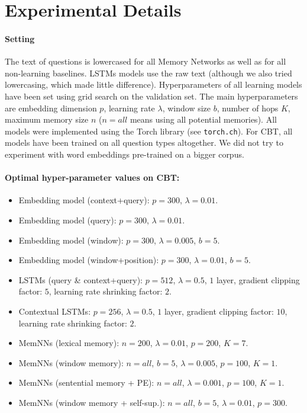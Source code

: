 \label{appendixmem}
\section{Experimental Details} \label{ap:hp}

\paragraph{Setting}
The text of questions is lowercased for all Memory Networks as
well as for all non-learning baselines. LSTMs models use the raw text (although we also tried lowercasing, which made little difference).
%
Hyperparameters of all learning models have been set using
grid search on the validation set.
%
The main hyperparameters are embedding dimension $p$, learning rate
$\lambda$, window size $b$, number of hops $K$, maximum memory size
$n$ ($n=all$ means using all potential memories).
%
All models were implemented using the Torch library (see {\tt torch.ch}).
%
For CBT, all models have been trained on all question types 
altogether. 
%
We did not try to experiment with word embeddings pre-trained on a
bigger corpus.

\paragraph{Optimal hyper-parameter values on CBT:}

\begin{itemize}
\item Embedding model (context+query): $p=300$, $\lambda=0.01$.
\item Embedding model (query): $p=300$, $\lambda=0.01$.
\item Embedding model (window): $p=300$, $\lambda=0.005$, $b=5$.
\item Embedding model (window+position): $p=300$, $\lambda=0.01$, $b=5$.
\item LSTMs (query \& context+query): $p=512$, $\lambda=0.5$, $1$
  layer, gradient clipping factor: $5$, learning rate shrinking factor: $2$.
\item Contextual LSTMs: $p=256$, $\lambda=0.5$, $1$
  layer, gradient clipping factor: $10$, learning rate shrinking
  factor: $2$.
\item MemNNs  (lexical memory): $n=200$, $\lambda=0.01$, $p=200$, $K=7$.
\item MemNNs  (window  memory): $n=all$, $b=5$, $\lambda=0.005$,
  $p=100$, $K=1$.
\item  MemNNs  (sentential memory + PE): $n=all$, $\lambda=0.001$,
  $p=100$, $K=1$.
\item MemNNs  (window  memory + self-sup.): $n=all$, $b=5$, $\lambda=0.01$,
  $p=300$.
\end{itemize}

